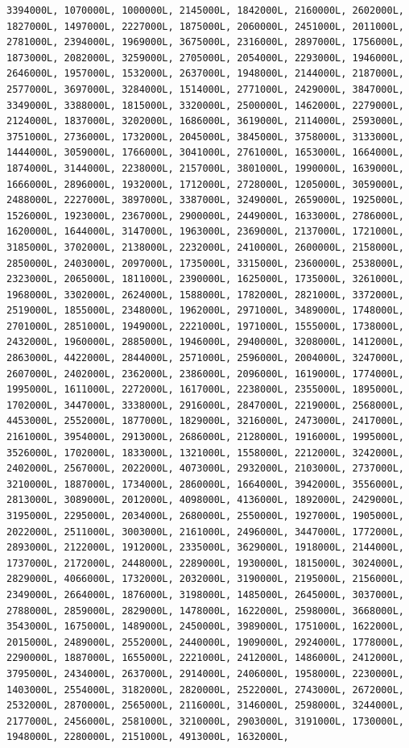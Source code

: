 \documentclass[
]{article}
\begin{document}
\begin{verbatim}
3394000L, 1070000L, 1000000L, 2145000L, 1842000L, 2160000L, 2602000L,  1827000L, 1497000L, 2227000L, 1875000L, 2060000L, 2451000L, 2011000L,  2781000L, 2394000L, 1969000L, 3675000L, 2316000L, 2897000L, 1756000L,  1873000L, 2082000L, 3259000L, 2705000L, 2054000L, 2293000L, 1946000L,  2646000L, 1957000L, 1532000L, 2637000L, 1948000L, 2144000L, 2187000L,  2577000L, 3697000L, 3284000L, 1514000L, 2771000L, 2429000L, 3847000L,  3349000L, 3388000L, 1815000L, 3320000L, 2500000L, 1462000L, 2279000L,  2124000L, 1837000L, 3202000L, 1686000L, 3619000L, 2114000L, 2593000L,  3751000L, 2736000L, 1732000L, 2045000L, 3845000L, 3758000L, 3133000L,  1444000L, 3059000L, 1766000L, 3041000L, 2761000L, 1653000L, 1664000L,  1874000L, 3144000L, 2238000L, 2157000L, 3801000L, 1990000L, 1639000L,  1666000L, 2896000L, 1932000L, 1712000L, 2728000L, 1205000L, 3059000L,  2488000L, 2227000L, 3897000L, 3387000L, 3249000L, 2659000L, 1925000L,  1526000L, 1923000L, 2367000L, 2900000L, 2449000L, 1633000L, 2786000L,  1620000L, 1644000L, 3147000L, 1963000L, 2369000L, 2137000L, 1721000L,  3185000L, 3702000L, 2138000L, 2232000L, 2410000L, 2600000L, 2158000L,  2850000L, 2403000L, 2097000L, 1735000L, 3315000L, 2360000L, 2538000L,  2323000L, 2065000L, 1811000L, 2390000L, 1625000L, 1735000L, 3261000L,  1968000L, 3302000L, 2624000L, 1588000L, 1782000L, 2821000L, 3372000L,  2519000L, 1855000L, 2348000L, 1962000L, 2971000L, 3489000L, 1748000L,  2701000L, 2851000L, 1949000L, 2221000L, 1971000L, 1555000L, 1738000L,  2432000L, 1960000L, 2885000L, 1946000L, 2940000L, 3208000L, 1412000L,  2863000L, 4422000L, 2844000L, 2571000L, 2596000L, 2004000L, 3247000L,  2607000L, 2402000L, 2362000L, 2386000L, 2096000L, 1619000L, 1774000L,  1995000L, 1611000L, 2272000L, 1617000L, 2238000L, 2355000L, 1895000L,  1702000L, 3447000L, 3338000L, 2916000L, 2847000L, 2219000L, 2568000L,  4453000L, 2552000L, 1877000L, 1829000L, 3216000L, 2473000L, 2417000L,  2161000L, 3954000L, 2913000L, 2686000L, 2128000L, 1916000L, 1995000L,  3526000L, 1702000L, 1833000L, 1321000L, 1558000L, 2212000L, 3242000L,  2402000L, 2567000L, 2022000L, 4073000L, 2932000L, 2103000L, 2737000L,  3210000L, 1887000L, 1734000L, 2860000L, 1664000L, 3942000L, 3556000L,  2813000L, 3089000L, 2012000L, 4098000L, 4136000L, 1892000L, 2429000L,  3195000L, 2295000L, 2034000L, 2680000L, 2550000L, 1927000L, 1905000L,  2022000L, 2511000L, 3003000L, 2161000L, 2496000L, 3447000L, 1772000L,  2893000L, 2122000L, 1912000L, 2335000L, 3629000L, 1918000L, 2144000L,  1737000L, 2172000L, 2448000L, 2289000L, 1930000L, 1815000L, 3024000L,  2829000L, 4066000L, 1732000L, 2032000L, 3190000L, 2195000L, 2156000L,  2349000L, 2664000L, 1876000L, 3198000L, 1485000L, 2645000L, 3037000L,  2788000L, 2859000L, 2829000L, 1478000L, 1622000L, 2598000L, 3668000L,  3543000L, 1675000L, 1489000L, 2450000L, 3989000L, 1751000L, 1622000L,  2015000L, 2489000L, 2552000L, 2440000L, 1909000L, 2924000L, 1778000L,  2290000L, 1887000L, 1655000L, 2221000L, 2412000L, 1486000L, 2412000L,  3795000L, 2434000L, 2637000L, 2914000L, 2406000L, 1958000L, 2230000L,  1403000L, 2554000L, 3182000L, 2820000L, 2522000L, 2743000L, 2672000L,  2532000L, 2870000L, 2565000L, 2116000L, 3146000L, 2598000L, 3244000L,  2177000L, 2456000L, 2581000L, 3210000L, 2903000L, 3191000L, 1730000L,  1948000L, 2280000L, 2151000L, 4913000L, 1632000L, 
\end{verbatim}
\end{document}

